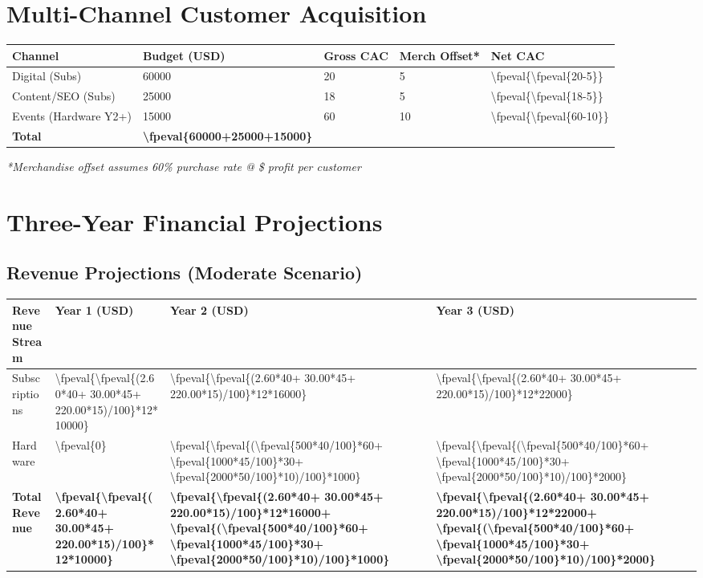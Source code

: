 \documentclass[11pt]{article}
\newcommand{\numfpeval}[1]{\num{\fpeval{#1}}}
\newcommand{\subBasicPrice}{2.60}
\newcommand{\subBasicMix}{40}
\newcommand{\subMediumPrice}{30.00}
\newcommand{\subMediumMix}{45}
\newcommand{\subGoldenPrice}{220.00}
\newcommand{\subGoldenMix}{15}
\newcommand{\subWeightedARPU}{\fpeval{(\subBasicPrice*\subBasicMix + \subMediumPrice*\subMediumMix + \subGoldenPrice*\subGoldenMix)/100}}
\newcommand{\hwEntryPrice}{500}
\newcommand{\hwEntryMargin}{40}
\newcommand{\hwEntryMix}{60}
\newcommand{\hwProfPrice}{1000}
\newcommand{\hwProfMargin}{45}
\newcommand{\hwProfMix}{30}
\newcommand{\hwPremiumPrice}{2000}
\newcommand{\hwPremiumMargin}{50}
\newcommand{\hwPremiumMix}{10}
\newcommand{\hwEntryGP}{\fpeval{\hwEntryPrice*\hwEntryMargin/100}}
\newcommand{\hwProfGP}{\fpeval{\hwProfPrice*\hwProfMargin/100}}
\newcommand{\hwPremiumGP}{\fpeval{\hwPremiumPrice*\hwPremiumMargin/100}}
\newcommand{\hwWeightedGP}{\fpeval{(\hwEntryGP*\hwEntryMix + \hwProfGP*\hwProfMix + \hwPremiumGP*\hwPremiumMix)/100}}
\newcommand{\merchAvgPrice}{28}
\newcommand{\merchAvgMargin}{48}
\newcommand{\merchAvgProfit}{\fpeval{\merchAvgPrice*\merchAvgMargin/100}}
\newcommand{\merchAttachRate}{60}
\newcommand{\totalSubsYearOne}{10000}
\newcommand{\totalSubsYearTwo}{16000}
\newcommand{\totalSubsYearThree}{22000}
\newcommand{\hwCustomersYearTwo}{1000}
\newcommand{\hwCustomersYearThree}{2000}
\newcommand{\cacNetDigital}{\fpeval{\cacDigital-\merchOffsetSubs}}
\newcommand{\cacNetContent}{\fpeval{\cacContent-\merchOffsetSubs}}
\newcommand{\cacNetEvents}{\fpeval{\cacEvents-\merchOffsetHw}}
\newcommand{\cacDigital}{20}
\newcommand{\cacContent}{18}
\newcommand{\cacEvents}{60}
\newcommand{\merchOffsetSubs}{5}
\newcommand{\merchOffsetHw}{10}
\newcommand{\budgetDigital}{60000}
\newcommand{\budgetContent}{25000}
\newcommand{\budgetEvents}{15000}
\begin{document}
\section{Multi-Channel Customer Acquisition}

\begin{table}[H]
\centering
\begin{tabularx}{\linewidth}{l Y Y Y Y}
\toprule
Channel & Budget (USD) & Gross CAC\cite{authoranalysis2024} & Merch Offset* & Net CAC \\\midrule
Digital (Subs) & \budgetDigital & \cacDigital & \merchOffsetSubs & \numfpeval{\cacNetDigital} \\
Content/SEO (Subs) & \budgetContent & \cacContent & \merchOffsetSubs & \numfpeval{\cacNetContent} \\
Events (Hardware Y2+) & \budgetEvents & \cacEvents & \merchOffsetHw & \numfpeval{\cacNetEvents} \\\midrule
\textbf{Total} & \textbf{\numfpeval{\budgetDigital+\budgetContent+\budgetEvents}} &  &  &  \\
\bottomrule
\end{tabularx}
\end{table}
\textit{*Merchandise offset assumes \merchAttachRate\% purchase rate @ \$\merchAvgProfit{} profit per customer}

\section{Three-Year Financial Projections}

\subsection{Revenue Projections (Moderate Scenario)}
\begin{table}[H]
\centering
\begin{tabularx}{\linewidth}{l Y Y Y}
\toprule
Revenue Stream & Year 1 (USD) & Year 2 (USD) & Year 3 (USD) \\\midrule
Subscriptions & \numfpeval{\subWeightedARPU*12*\totalSubsYearOne} & \numfpeval{\subWeightedARPU*12*\totalSubsYearTwo} & \numfpeval{\subWeightedARPU*12*\totalSubsYearThree} \\
Hardware & \numfpeval{0} & \numfpeval{\hwWeightedGP*\hwCustomersYearTwo} & \numfpeval{\hwWeightedGP*\hwCustomersYearThree} \\\midrule
\textbf{Total Revenue} & \textbf{\numfpeval{\subWeightedARPU*12*\totalSubsYearOne}} & \textbf{\numfpeval{\subWeightedARPU*12*\totalSubsYearTwo + \hwWeightedGP*\hwCustomersYearTwo}} & \textbf{\numfpeval{\subWeightedARPU*12*\totalSubsYearThree + \hwWeightedGP*\hwCustomersYearThree}} \\
\bottomrule
\end{tabularx}
\end{table}
\end{document}
